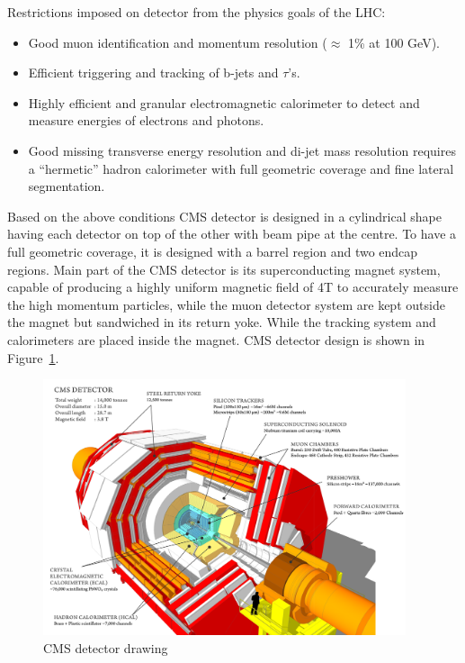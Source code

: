 Restrictions imposed on detector from the physics goals of the LHC:

\begin{itemize}
	\item Good muon identification and momentum resolution ($\approx$ 1\% at 100 GeV).
	\item Efficient triggering and tracking of b-jets and $\tau$'s.
	\item Highly efficient and granular electromagnetic calorimeter to detect and measure energies of electrons and photons.
	\item Good missing transverse energy resolution and di-jet mass resolution requires a ``hermetic'' hadron calorimeter with full geometric coverage and fine lateral segmentation.
\end{itemize}


Based on the above conditions CMS detector is designed in a cylindrical shape having each detector on top of the other with beam pipe at the centre. To have a full geometric coverage, it is designed with a barrel region and two endcap regions. Main part of the CMS detector is its superconducting magnet system, capable of producing a highly uniform magnetic field of 4T to accurately measure the high momentum particles, while the muon detector system are kept outside the magnet but sandwiched in its return yoke. While the tracking system and calorimeters are placed inside the magnet. CMS detector design is shown in Figure~\ref{fig:CMS-detector}.
\begin{figure}[!htbp]
	\centering
	\includegraphics[width=0.95\textwidth]{figures/LHC/cms_120918_03.png}
	\caption{CMS detector drawing}
	\label{fig:CMS-detector}
\end{figure}


